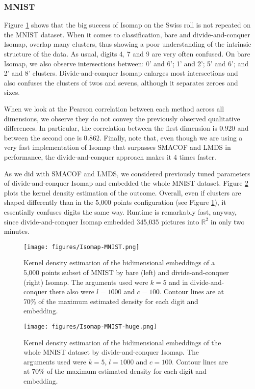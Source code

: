 \subsubsection{MNIST}

Figure \ref{fig:Isomap-MNIST} shows that the big success of Isomap on the Swiss roll is not repeated on the MNIST dataset. When it comes to classification, bare and divide-and-conquer Isomap, overlap many clusters, thus showing a poor understanding of the intrinsic structure of the data. As usual, digits 4, 7 and 9 are very often confused. On bare Isomap, we also observe intersections between: 0' and 6'; 1' and 2'; 5' and 6'; and 2' and 8' clusters. Divide-and-conquer Isomap enlarges most intersections and also confuses the clusters of twos and sevens, although it separates zeroes and sixes.

When we look at the Pearson correlation between each method across all dimensions, we observe they do not convey the previously observed qualitative differences. In particular, the correlation between the first dimension is 0.920 and between the second one is 0.862. Finally, note that, even though we are using a very fast implementation of Isomap that surpasses SMACOF and LMDS in performance, the divide-and-conquer approach makes it 4 times faster.

As we did with SMACOF and LMDS, we considered previously tuned parameters of divide-and-conquer Isomap and embedded the whole MNIST dataset. Figure \ref{fig:Isomap-MNIST-huge} plots the kernel density estimation of the outcome. Overall, even if clusters are shaped differently than in the 5,000 points configuration (see Figure \ref{fig:Isomap-MNIST}), it essentially confuses  digits the same way. Runtime is remarkably fast, anyway, since divide-and-conquer Isomap embedded 345,035 pictures into $\mathbb{R}^2$ in only two minutes.

\begin{figure}
    \centering
    \texttt{[image: figures/Isomap-MNIST.png]}
    \caption{Kernel density estimation of the bidimensional embeddings of a 5,000 points subset of MNIST by bare (left) and divide-and-conquer (right) Isomap. The arguments used were $k=5$ and in divide-and-conquer there also were $l=1000$ and $c=100$. Contour lines are at 70\% of the maximum estimated density for each digit and embedding.}
    \label{fig:Isomap-MNIST}
\end{figure}

\begin{figure}
    \centering
    \texttt{[image: figures/Isomap-MNIST-huge.png]}
    \caption{Kernel density estimation of the bidimensional embeddings of the whole MNIST dataset by divide-and-conquer Isomap. The arguments used were $k=5, \, l=1000$ and $c=100$. Contour lines are at 70\% of the maximum estimated density for each digit and embedding.}
    \label{fig:Isomap-MNIST-huge}
\end{figure}

